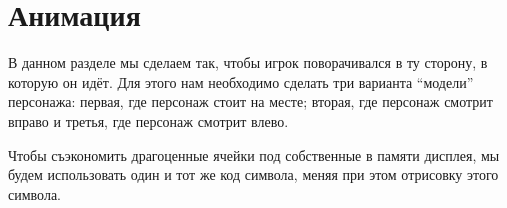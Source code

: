 \documentclass[../sparc.tex]{subfiles}
\begin{document}
\section{Анимация}

В данном разделе мы сделаем так, чтобы игрок поворачивался в ту сторону, в
которую он идёт.  Для этого нам необходимо сделать три варианта ``модели''
персонажа: первая, где персонаж стоит на месте; вторая, где персонаж смотрит
вправо и третья, где персонаж смотрит влево.

Чтобы съэкономить драгоценные ячейки под собственные в памяти дисплея, мы будем
использовать один и тот же код символа, меняя при этом отрисовку этого символа.
\end{document}

